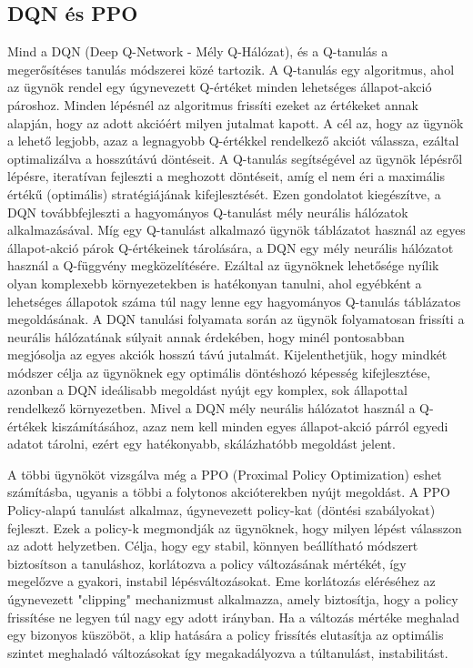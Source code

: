 \documentclass[
]{thesis-ekf}
\theoremstyle{definition}
\theoremstyle{remark}
\begin{document}
\subsection{DQN és PPO}

Mind a DQN (Deep Q-Network - Mély Q-Hálózat), és a Q-tanulás a megerősítéses tanulás módszerei közé tartozik. A Q-tanulás egy algoritmus, ahol az ügynök rendel egy úgynevezett Q-értéket minden lehetséges állapot-akció pároshoz. Minden lépésnél az algoritmus frissíti ezeket az értékeket annak alapján, hogy az adott akcióért milyen jutalmat kapott. A cél az, hogy az ügynök a lehető legjobb, azaz a legnagyobb Q-értékkel rendelkező akciót válassza, ezáltal optimalizálva a hosszútávú döntéseit. A Q-tanulás segítségével az ügynök lépésről lépésre, iteratívan fejleszti a meghozott döntéseit, amíg el nem éri a maximális értékű (optimális) stratégiájának kifejlesztését. Ezen gondolatot kiegészítve, a DQN továbbfejleszti a hagyományos Q-tanulást mély neurális hálózatok alkalmazásával. Míg egy Q-tanulást alkalmazó ügynök táblázatot használ az egyes állapot-akció párok Q-értékeinek tárolására, a DQN egy mély neurális hálózatot használ a Q-függvény megközelítésére. Ezáltal az ügynöknek lehetősége nyílik olyan komplexebb környezetekben is hatékonyan tanulni, ahol egyébként a lehetséges állapotok száma túl nagy lenne egy hagyományos Q-tanulás táblázatos megoldásának. A DQN tanulási folyamata során az ügynök folyamatosan frissíti a neurális hálózatának súlyait annak érdekében, hogy minél pontosabban megjósolja az egyes akciók hosszú távú jutalmát. Kijelenthetjük, hogy mindkét módszer célja az ügynöknek egy optimális döntéshozó képesség kifejlesztése, azonban a DQN ideálisabb megoldást nyújt egy komplex, sok állapottal rendelkező környezetben. Mivel a DQN mély neurális hálózatot használ a Q-értékek kiszámításához, azaz nem kell minden egyes állapot-akció párról egyedi adatot tárolni, ezért egy hatékonyabb, skálázhatóbb megoldást jelent.

A többi ügynököt vizsgálva még a PPO (Proximal Policy Optimization) eshet számításba, ugyanis a többi a folytonos akcióterekben nyújt megoldást. A PPO Policy-alapú tanulást alkalmaz, úgynevezett policy-kat (döntési szabályokat) fejleszt. Ezek a policy-k megmondják az ügynöknek, hogy milyen lépést válasszon az adott helyzetben. Célja, hogy egy stabil, könnyen beállítható módszert biztosítson a tanuláshoz, korlátozva a policy változásának mértékét, így megelőzve a gyakori, instabil lépésváltozásokat. Eme korlátozás eléréséhez az úgynevezett "clipping" mechanizmust alkalmazza, amely biztosítja, hogy a policy frissítése ne legyen túl nagy egy adott irányban. Ha a változás mértéke meghalad egy bizonyos küszöböt, a klip hatására a policy frissítés elutasítja az optimális szintet meghaladó változásokat így megakadályozva a túltanulást, instabilitást. \cite{PPO}
\end{document}
